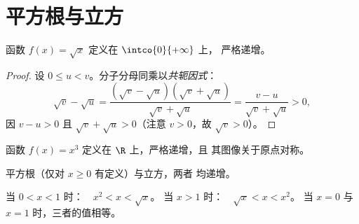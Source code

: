 \section{平方根与立方}

\begin{proposition}[平方根函数]\label{prop:g10:reffunc:sqrt}
函数 $f(x) = \sqrt{x}$ 定义在 $\intco{0}{+\infty}$ 上，
严格递增。
\end{proposition}

\begin{proof}
设 $0 \leq u < v$。分子分母同乘以\emph{共轭因式}：
\[
\sqrt v - \sqrt u
= \frac{(\sqrt v - \sqrt u)(\sqrt v + \sqrt u)}{\sqrt v + \sqrt u}
= \frac{v - u}{\sqrt v + \sqrt u} > 0,
\]
因 $v - u > 0$ 且 $\sqrt v + \sqrt u > 0$（注意 $v > 0$，故
$\sqrt v > 0$）。
\end{proof}

\begin{proposition}[立方函数]\label{prop:g10:reffunc:cube}
函数 $f(x) = x^3$ 定义在 $\R$ 上，严格递增，且
其图像关于原点对称。
\end{proposition}
\admitted

\begin{omfigure}
\hfill
{}

{\small 平方根（仅对 $x \geq 0$ 有定义）与立方，两者
均递增。}
\end{omfigure}

\begin{proposition}[比较 $x$、$x^2$ 与 $\sqrt x$]\label{prop:g10:reffunc:compare}
当 $0 < x < 1$ 时：\ \ $x^2 < x < \sqrt x$。\quad
当 $x > 1$ 时：\ \ $\sqrt x < x < x^2$。\quad
当 $x = 0$ 与 $x = 1$ 时，三者的值相等。
\end{proposition}

